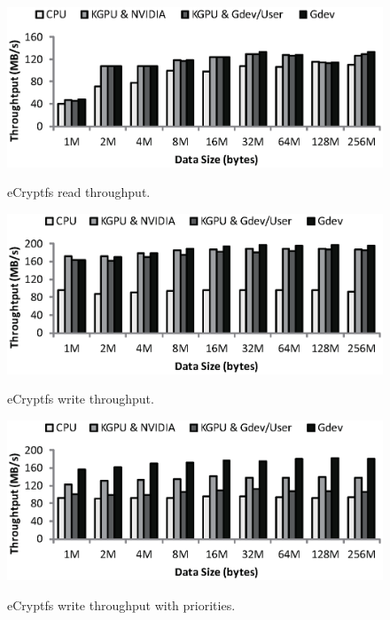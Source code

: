 \begin{figure}[t]
 \begin{center}
  \includegraphics[width=0.9\hsize]{eps/ecryptfs_read.eps}\\
  \vspace{-1.5em}
  \caption{eCryptfs read throughput.}
  \label{fig:ecryptfs_read}
 \end{center}
 \vspace{-1.5em}
 \begin{center}
  \includegraphics[width=0.9\hsize]{eps/ecryptfs_write.eps}\\
  \vspace{-1.5em}
  \caption{eCryptfs write throughput.}
  \label{fig:ecryptfs_write}
 \end{center}
 \vspace{-1.5em}
 \begin{center}
  \includegraphics[width=0.9\hsize]{eps/ecryptfs_write_multitask.eps}\\
  \vspace{-1.5em}
  \caption{eCryptfs write throughput with priorities.}
  \label{fig:ecryptfs_write_multitask}
 \end{center}
 \vspace{-1.5em}
\end{figure}


